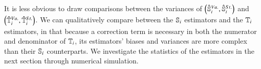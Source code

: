 It is less obvious to draw comparisons between the variances of $\left(\unpollSsalt{i},\pollSsalt{i}\right)$ and $\left(\unpollTsalt{i},\pollTsalt{i}\right)$.
We can qualitatively compare between the $\S{i}$ estimators and the $\T{i}$ estimators, in that because a correction term is necessary in both the numerator and denominator of $\T{i}$, its estimators' biases and variances are more complex than their $\S{i}$ counterparts. 
We investigate the statistics of the estimators in the next section through numerical simulation.